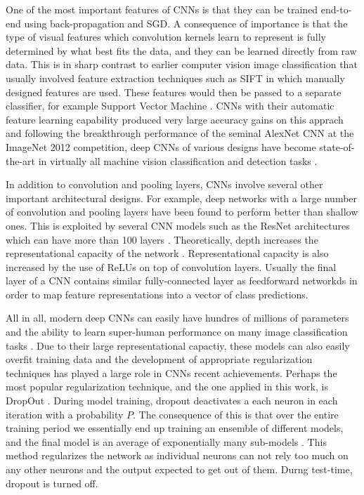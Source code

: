 \documentclass[12pt]{report}
\begin{document}
One of the most important features of CNNs is that they can be trained end-to-end using back-propagation and SGD. A consequence of importance is that the type of visual features which convolution kernels learn to represent is fully determined by what best fits the data, and they can be learned directly from raw data. This is in sharp contrast to earlier computer vision image classification that usually involved feature extraction techniques \cite{Prince2012} such as SIFT \cite{Lowe1999} in which manually designed features are used. These features would then be passed to a separate classifier, for example Support Vector Machine \cite{Weston2010}. CNNs with their automatic feature learning capability produced very large accuracy gains on this apprach \cite{Razavian2014} and following the breakthrough performance of the seminal AlexNet CNN \cite{Krizhevsky2012} at the ImageNet 2012 competition, deep CNNs of various designs have become state-of-the-art in virtually all machine vision classification and detection tasks \cite{JurgenSchmidhuber2015}.

In addition to convolution and pooling layers, CNNs involve several other important architectural designs. For example, deep networks with a large number of convolution and pooling layers have been found to perform better \cite{Srivastava2015} than shallow ones. This is exploited by several CNN models such as the ResNet architectures which can have more than 100 layers \cite{He2015}. Theoretically, depth increases the representational capacity of the network \cite{Sun2015}. Representational capacity is also increased by the use of ReLUs on top of convolution layers. Usually the final layer of a CNN contains similar fully-connected layer as feedforward networkds in order to map feature representations into a vector of class predictions.

All in all, modern deep CNNs can easily have hundres of millions of parameters and the ability to learn super-human performance on many image classification tasks \cite{Lecun2015}. Due to their large representational capactiy, these models can also easily overfit training data and the development of appropriate regularization techniques has played a large role in CNNs recent achievements. Perhaps the most popular regularization technique, and the one applied in this work, is DropOut \cite{Srivastava2014}. During model training, dropout deactivates a each neuron in each iteration with a probability $P$. The consequence of this is that over the entire training period we essentially end up training an ensemble of different models, and the final model is an average of exponentially many sub-models \cite{Goodfellow2016}. This method regularizes the network as individual neurons can not rely too much on any other neurons and the output expected to get out of them. Durng test-time, dropout is turned off.
\end{document}
